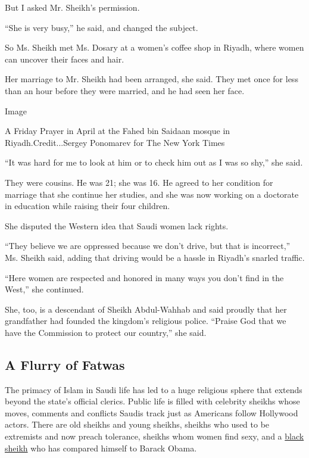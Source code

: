 But I asked Mr. Sheikh's permission.

``She is very busy,'' he said, and changed the subject.

So Ms. Sheikh met Ms. Dosary at a women's coffee shop in Riyadh, where
women can uncover their faces and hair.

Her marriage to Mr. Sheikh had been arranged, she said. They met once
for less than an hour before they were married, and he had seen her
face.

Image

A Friday Prayer in April at the Fahed bin Saidaan mosque in
Riyadh.Credit...Sergey Ponomarev for The New York Times

``It was hard for me to look at him or to check him out as I was so
shy,'' she said.

They were cousins. He was 21; she was 16. He agreed to her condition for
marriage that she continue her studies, and she was now working on a
doctorate in education while raising their four children.

She disputed the Western idea that Saudi women lack rights.

``They believe we are oppressed because we don't drive, but that is
incorrect,'' Ms. Sheikh said, adding that driving would be a hassle in
Riyadh's snarled traffic.

``Here women are respected and honored in many ways you don't find in
the West,'' she continued.

She, too, is a descendant of Sheikh Abdul-Wahhab and said proudly that
her grandfather had founded the kingdom's religious police. ``Praise God
that we have the Commission to protect our country,'' she said.

\hypertarget{a-flurry-of-fatwas}{%
\subsection{A Flurry of Fatwas}\label{a-flurry-of-fatwas}}

The primacy of Islam in Saudi life has led to a huge religious sphere
that extends beyond the state's official clerics. Public life is filled
with celebrity sheikhs whose moves, comments and conflicts Saudis track
just as Americans follow Hollywood actors. There are old sheikhs and
young sheikhs, sheikhs who used to be extremists and now preach
tolerance, sheikhs whom women find sexy, and a
\href{http://www.nytimes.com/2009/04/11/world/middleeast/11saudi.html}{black
sheikh} who has compared himself to Barack Obama.

